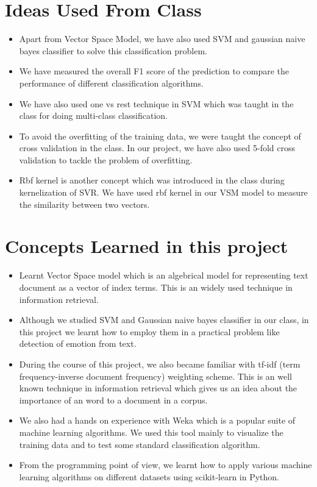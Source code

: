 \section{Ideas Used From Class}
\label{ideas-from-class}
\begin{itemize}
    \item Apart from Vector Space Model, we have also used SVM and gaussian naive bayes classifier to solve this classification problem.
    \item We have measured the overall F1 score of the prediction to compare the
        performance of different classification algorithms.
    \item We have also used one vs rest technique in SVM which was taught in the class
        for doing multi-class classification.
    \item To avoid the overfitting of the training data, we were taught the
        concept of cross validation in the class. In our project, we have also used 5-fold
        cross validation to tackle the problem of overfitting.
    \item Rbf kernel is another concept which was introduced in the class during kernelization of SVR. We have used rbf kernel in our VSM model to measure the similarity between two vectors.
\end{itemize}

\section{Concepts Learned in this project}
\begin{itemize}
    \item Learnt Vector Space model which is an algebrical model for representing
        text document as a vector of index terms. This is an widely used
        technique in information retrieval.
    \item Although we studied SVM and Gaussian naive bayes classifier in our
        class, in this project we learnt how to employ them in a practical
        problem like detection of emotion from text.
    \item During the course of this project, we also became familiar with
        tf-idf (term frequency-inverse document frequency) weighting scheme.
        This is an well known technique in information retrieval which gives us
        an idea about the importance of an word to a document in a corpus.
    \item We also had a hands on experience with Weka which is a popular suite
        of machine learning algorithms. We used this tool mainly to visualize the
        training data and to test some standard classification algorithm.
    \item From the programming point of view, we learnt how to apply various
        machine learning algorithms on different datasets using scikit-learn in Python.
\end{itemize}

